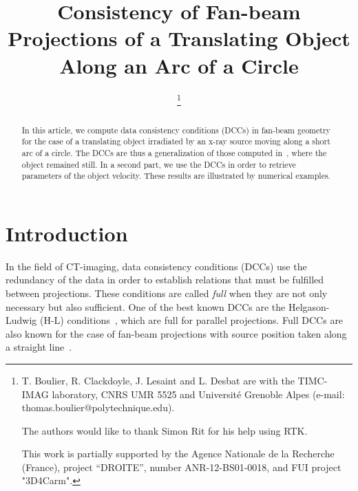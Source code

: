 \documentclass[letterpaper,twocolumn]{IEEEtran}
\title{Consistency of Fan-beam Projections of a Translating Object Along an Arc of a Circle}
\date{}
\begin{document}
\author{
	\thanks{T. Boulier, R. Clackdoyle, J. Lesaint and L. Desbat are with the TIMC-IMAG laboratory, CNRS UMR 5525 and Universit\'e Grenoble Alpes (e-mail: thomas.boulier@polytechnique.edu).

	The authors would like to thank Simon Rit for his help using RTK.
			
	This work is partially supported by the Agence Nationale de la Recherche (France), project ``DROITE'', number ANR-12-BS01-0018, and FUI project "3D4Carm".
}		
\IEEEauthorblockA{}
}

\maketitle

\begin{abstract}
In this article, we compute data consistency conditions (DCCs) in fan-beam geometry for the case of a translating object irradiated by an x-ray source moving along a short arc of a circle. The DCCs are thus a generalization of those computed in~\cite{clackdoyle2015consistency}, where the object remained still. In a second part, we use the DCCs in order to retrieve parameters of the object velocity. These results are illustrated by numerical examples.
\end{abstract}

\section{Introduction}

In the field of CT-imaging, data consistency conditions (DCCs) use the redundancy of the data in order to establish relations that must be fulfilled  between projections. These conditions are called \emph{full} when they are not only necessary but also sufficient. One of the best known DCCs are the Helgason-Ludwig (H-L) conditions~\cite{helgason1980radon,ludwig1966radon}, which are full for parallel projections. Full DCCs are also known for the case of fan-beam projections with source position taken along a straight line~\cite{clackdoyle2013necessary}.
\end{document}
